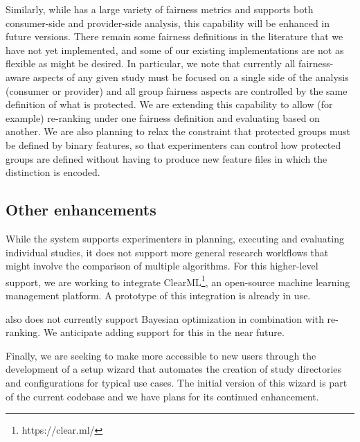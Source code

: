 Similarly, while \libauto{} has a large variety of fairness metrics and supports both consumer-side and provider-side analysis, this capability will be enhanced in future versions. There remain some fairness definitions in the literature that we have not yet implemented, and some of our existing implementations are not as flexible as might be desired. In particular, we note that currently all fairness-aware aspects of any given study must be focused on a single side of the analysis (consumer or provider) and all group fairness aspects are controlled by the same definition of what is protected. We are extending this capability to allow (for example) re-ranking under one fairness definition and evaluating based on another. We are also planning to relax the constraint that protected groups must be defined by binary features, so that experimenters can control how protected groups are defined without having to produce new feature files in which the distinction is encoded. 

\subsection{Other enhancements}
While the system supports experimenters in planning, executing and evaluating individual studies, it does not support more general research workflows that might involve the comparison of multiple algorithms. For this higher-level support, we are working to integrate ClearML\footnote{https://clear.ml/}, an open-source machine learning management platform. A prototype of this integration is already in use.

\libauto{} also does not currently support Bayesian optimization in combination with re-ranking. We anticipate adding support for this in the near future.  

Finally, we are seeking to make \libauto{} more accessible to new users through the development of a setup wizard that automates the creation of study directories and configurations for typical use cases. The initial version of this wizard is part of the current codebase and we have plans for its continued enhancement. 


